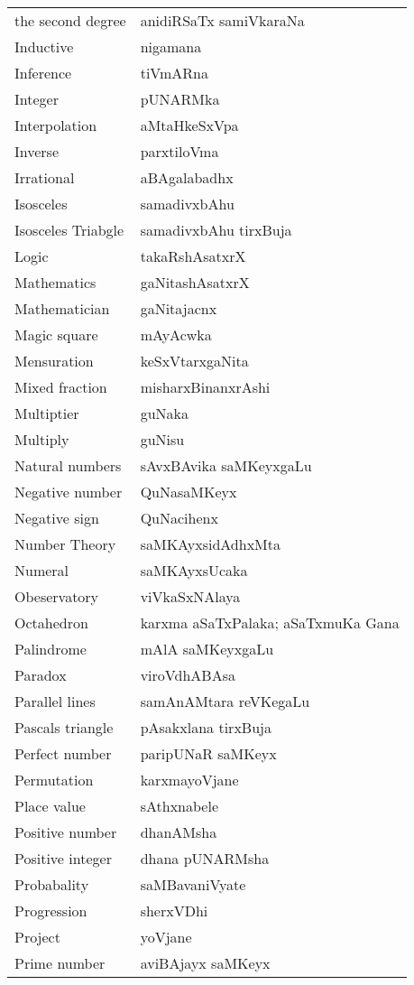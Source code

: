 {\begin{longtable}{>{\rm}l@{\hspace{1cm}}l}
the second degree &  anidiRSaTx samiVkaraNa\\
Inductive & nigamana\\
Inference & tiVmARna\\
Integer & pUNARMka\\
Interpolation & aMtaHkeSxVpa\\
Inverse & parxtiloVma\\
Irrational & aBAgalabadhx\\
Isosceles & samadivxbAhu\\
Isosceles Triabgle & samadivxbAhu tirxBuja\\
Logic & takaRshAsatxrX\\
Mathematics & gaNitashAsatxrX\\
Mathematician & gaNitajacnx\\
Magic square & mAyAcwka\\
Mensuration & keSxVtarxgaNita\\
Mixed fraction & misharxBinanxrAshi\\
Multiptier & guNaka\\
Multiply & guNisu\\
Natural numbers & sAvxBAvika saMKeyxgaLu\\
Negative number & QuNasaMKeyx\\
Negative sign & QuNacihenx\\
Number Theory & saMKAyxsidAdhxMta\\
Numeral & saMKAyxsUcaka\\
Obeservatory & viVkaSxNAlaya\\
Octahedron & karxma aSaTxPalaka; aSaTxmuKa Gana\\
Palindrome & mAlA saMKeyxgaLu\\
Paradox & viroVdhABAsa\\
Parallel lines & samAnAMtara reVKegaLu\\
Pascals triangle & pAsakxlana tirxBuja\\
Perfect number & paripUNaR saMKeyx\\
Permutation & karxmayoVjane\\
Place value & sAthxnabele\\
Positive number & dhanAMsha\\
Positive integer & dhana pUNARMsha\\
Probabality & saMBavaniVyate\\
Progression & sherxVDhi\\
Project & yoVjane\\
Prime number & aviBAjayx saMKeyx\\

\end{longtable}}
